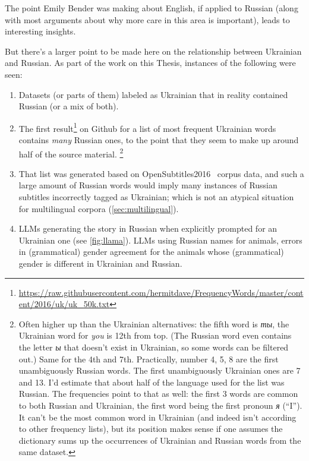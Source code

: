The point Emily Bender was making about English, if applied to Russian 
(along with most arguments about why more care in this area is important), leads to interesting insights. 

But there's a larger point to be made here on the relationship between Ukrainian and Russian.
As part of the work on this Thesis, instances of the following were seen:

\begin{enumerate}
    \tightlist
    \item Datasets (or parts of them) labeled as Ukrainian that in reality contained Russian (or a mix of both).
    \item The first result\footnote{\href{https://raw.githubusercontent.com/hermitdave/FrequencyWords/master/content/2016/uk/uk_50k.txt}{https://raw.githubusercontent.com/hermitdave/FrequencyWords/master/content/2016/uk/uk\_50k.txt}} on Github for a list of most frequent Ukrainian words contains \textit{many} Russian ones, to the point that they seem to make up around half of the source material.%
    \footnote{Often higher up than the Ukrainian alternatives: the fifth word is \textit{ты}, the Ukrainian word for \textit{you} is 12th from top. (The Russian word even contains the letter \textit{ы} that doesn't exist in Ukrainian, so some words can be filtered out.) Same for the 4th and 7th. Practically, number 4, 5, 8 are the first unambiguously Russian words. The first unambiguously Ukrainian ones are 7 and 13. I'd estimate that about half of the language used for the list was Russian. The frequencies point to that as well: the first 3 words are common to both Russian and Ukrainian, the first word being the first pronoun \textit{я} (``I''). It can't be the most common word in Ukrainian (and indeed isn't according to other frequency lists), but its position makes sense if one assumes the dictionary sums up the occurrences of Ukrainian and Russian words from the same dataset.
    }
    \item That list was generated based on OpenSubtitles2016~\cite{lison2016opensubtitles2016} corpus data, and such a large amount of Russian words would imply many instances of Russian subtitles incorrectly tagged as Ukrainian; which is not an atypical situation for multilingual corpora (\autoref{sec:multilingual}).
    \item LLMs generating the story in Russian when explicitly prompted for an Ukrainian one (see \autoref{fig:llama}). LLMs using Russian names for animals, errors in (grammatical) gender agreement for the animals whose (grammatical) gender is different in Ukrainian and Russian.
\end{enumerate}

